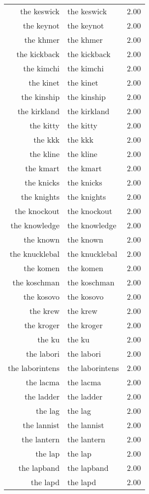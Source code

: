 \begin{table}[ht]
\begin{tabular}{rlr}
  the keswick & the keswick & 2.00 \\ 
  the keynot & the keynot & 2.00 \\ 
  the khmer & the khmer & 2.00 \\ 
  the kickback & the kickback & 2.00 \\ 
  the kimchi & the kimchi & 2.00 \\ 
  the kinet & the kinet & 2.00 \\ 
  the kinship & the kinship & 2.00 \\ 
  the kirkland & the kirkland & 2.00 \\ 
  the kitty & the kitty & 2.00 \\ 
  the kkk & the kkk & 2.00 \\ 
  the kline & the kline & 2.00 \\ 
  the kmart & the kmart & 2.00 \\ 
  the knicks & the knicks & 2.00 \\ 
  the knights & the knights & 2.00 \\ 
  the knockout & the knockout & 2.00 \\ 
  the knowledge & the knowledge & 2.00 \\ 
  the known & the known & 2.00 \\ 
  the knucklebal & the knucklebal & 2.00 \\ 
  the komen & the komen & 2.00 \\ 
  the koschman & the koschman & 2.00 \\ 
  the kosovo & the kosovo & 2.00 \\ 
  the krew & the krew & 2.00 \\ 
  the kroger & the kroger & 2.00 \\ 
  the ku & the ku & 2.00 \\ 
  the labori & the labori & 2.00 \\ 
  the laborintens & the laborintens & 2.00 \\ 
  the lacma & the lacma & 2.00 \\ 
  the ladder & the ladder & 2.00 \\ 
  the lag & the lag & 2.00 \\ 
  the lannist & the lannist & 2.00 \\ 
  the lantern & the lantern & 2.00 \\ 
  the lap & the lap & 2.00 \\ 
  the lapband & the lapband & 2.00 \\ 
  the lapd & the lapd & 2.00 \\ 

\end{tabular}
\end{table}
